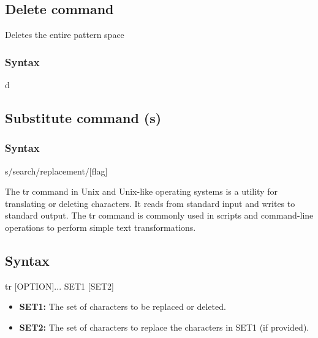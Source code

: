 \documentclass{report}
\begin{document}
    \bigbreak \noindent 
    \subsection{Delete command}
    \bigbreak \noindent 
    Deletes the entire pattern space
    \bigbreak \noindent 
    \bigbreak \noindent 
    \subsubsection{Syntax}
    \bigbreak \noindent 
    \begin{bashcode}
    [address] d 
    \end{bashcode}

    \bigbreak \noindent 
    \subsection{Substitute command (s)}
    \bigbreak \noindent 
    \subsubsection{Syntax}
    \bigbreak \noindent 
    \begin{bashcode}
        [address] s/search/replacement/[flag]
    \end{bashcode}


    \pagebreak 
    \bigbreak \noindent 
    The tr command in Unix and Unix-like operating systems is a utility for translating or deleting characters. It reads from standard input and writes to standard output. The tr command is commonly used in scripts and command-line operations to perform simple text transformations.
    \bigbreak \noindent 
    \subsection{Syntax}
    \bigbreak \noindent 
    \begin{bashcode}
        tr [OPTION]... SET1 [SET2]
    \end{bashcode}
    \bigbreak \noindent 
    \begin{itemize}
        \item \textbf{SET1:} The set of characters to be replaced or deleted.
        \item \textbf{SET2:} The set of characters to replace the characters in SET1 (if provided).
    \end{itemize}
    \bigbreak \noindent 
\end{document}
